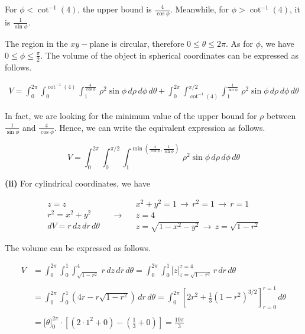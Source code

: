 \documentclass{article}
\begin{document}
For $\displaystyle\phi<\cot^{-1}(4)$, the upper bound is $\displaystyle \frac4{\cos\phi}$. Meanwhile, for $\displaystyle\phi>\cot^{-1}(4)$, it is $\displaystyle \frac1{\sin\phi}$.

The region in the $xy-$plane is circular, therefore $0\leq\theta\leq2\pi$. As for $\phi$, we have $\displaystyle0\leq\phi\leq\frac{\pi}2$. The volume of the object in spherical coordinates can be expressed as follows.

\[
\boxed{\begin{array}{cc}
V=\displaystyle\int_0^{2\pi}\int_0^{\cot^{-1}(4)}\int_1^{\textstyle\frac4{\cos\phi}}\,\rho^2\sin\phi\,d\rho\,d\phi\,d\theta
+\int_0^{2\pi}\int_{\cot^{-1}(4)}^{\pi/2}\int_1^{\textstyle\frac1{\sin\phi}}\,\rho^2\sin\phi\,d\rho\,d\phi\,d\theta 
\end{array}}
\]

In fact, we are looking for the minimum value of the upper bound for $\rho$ between $\displaystyle\frac1{\sin\phi}$ and $\displaystyle\frac4{\cos\phi}$. Hence, we can write the equivalent expression as follows.

\[
\boxed{V=\displaystyle\int_0^{2\pi}\int_0^{\pi/2}\int_1^{\min\left(\textstyle\frac4{\cos\phi},\frac1{\sin\phi}\right)}\,\rho^2\sin\phi\,d\rho\,d\phi\,d\theta}
\]

\textbf{(ii)} For cylindrical coordinates, we have

\[
\begin{array}{c}
z=z\\
r^2=x^2+y^2\\
dV=r\,dz\,dr\,d\theta
\end{array}\quad\rightarrow\quad
\begin{array}{c}
x^2+y^2=1\,\rightarrow\,r^2 = 1\,\rightarrow\,r=1\\
z=4\\
z=\sqrt{1-x^2-y^2}\,\rightarrow\,z=\sqrt{1-r^2}
\end{array}
\]

The volume can be expressed as follows.

\begin{align*}
    V&=\int_0^{2\pi}\int_0^1\int_{\sqrt{1-r^2}}^{4}\,r\,dz\,dr\,d\theta=\int_0^{2\pi}\int_0^1\big[z\big]_{z=\sqrt{1-r^2}}^{z=4}\,r\,dr\,d\theta\\\\&=\int_0^{2\pi}\int_0^1\left(4r-r\sqrt{1-r^2}\right)\,dr\,d\theta=\int_0^{2\pi}\left[2r^2 + \frac13\left(1-r^2\right)^{3/2}\right]_{r=0}^{r=1}\,d\theta\\\\&=\big[\theta\big]_0^{2\pi}\cdot\left[\left(2\cdot1^2 +0\right)-\left(\frac13+0\right)\right]=\boxed{\frac{10\pi}3}
\end{align*}
\end{document}
